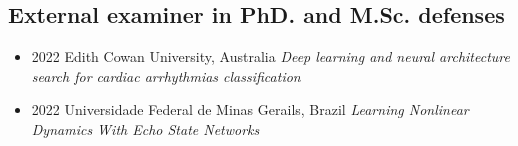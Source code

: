 \documentclass[10pt,A4]{article} %
\begin{document}
\subsection{External examiner in PhD. and M.Sc. defenses}

\begin{itemize}

    \item {}
    { 2022 }
    {  }
    { Edith Cowan University, Australia }
    { {\it Deep learning and neural architecture search for cardiac arrhythmias classification } }

    \item {}
    { 2022 }
    {  }
    { Universidade Federal de Minas Gerails, Brazil }
    { {\it Learning Nonlinear Dynamics With Echo State Networks } }

\end{itemize}
\end{document}
